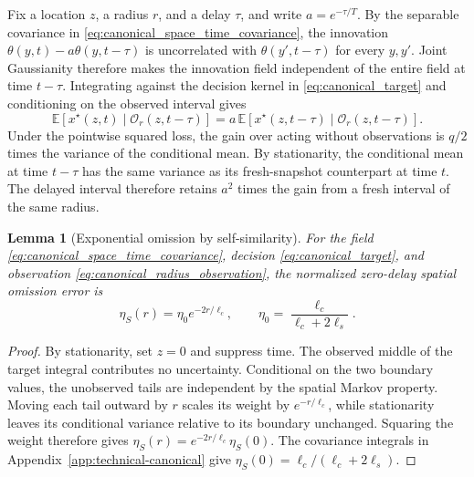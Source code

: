\documentclass[11pt]{article}
\newtheorem{lemma}{Lemma}
\begin{document}
Fix a location $z$, a radius $r$, and a delay $\tau$, and write
$a=e^{-\tau/T}$. By the separable covariance in
\eqref{eq:canonical_space_time_covariance}, the innovation
$\theta(y,t)-a\theta(y,t-\tau)$ is uncorrelated with
$\theta(y',t-\tau)$ for every $y,y'$. Joint Gaussianity therefore makes
the innovation field independent of the entire field at time $t-\tau$.
Integrating against the decision kernel in \eqref{eq:canonical_target}
and conditioning on the observed interval gives
\[
\mathbb E[x^\star(z,t)\mid \mathcal O_r(z,t-\tau)]
= a\,\mathbb E[x^\star(z,t-\tau)\mid \mathcal O_r(z,t-\tau)].
\]
Under the pointwise squared loss, the gain over acting without observations
is $q/2$ times the variance of the conditional mean. By stationarity,
the conditional mean at time $t-\tau$ has the same variance as its
fresh-snapshot counterpart at time $t$. The delayed interval therefore
retains $a^2$ times the gain from a fresh interval of the same radius.

\begin{lemma}[Exponential omission by self-similarity]
\label{prop:canonical_eta_S}
For the field \eqref{eq:canonical_space_time_covariance}, decision
\eqref{eq:canonical_target}, and observation
\eqref{eq:canonical_radius_observation}, the normalized zero-delay spatial
omission error is
\begin{equation}
\eta_S(r)=\eta_0e^{-2r/\ell_c},\qquad
\eta_0=\frac{\ell_c}{\ell_c+2\ell_s}.
\label{eq:canonical_eta_S}
\end{equation}
\end{lemma}

\begin{proof}
By stationarity, set $z=0$ and suppress time. The observed middle of the
target integral contributes no uncertainty. Conditional on the two boundary
values, the unobserved tails are independent by the spatial Markov property.
Moving each tail outward by $r$ scales its weight by $e^{-r/\ell_c}$,
while stationarity leaves its conditional variance relative to its boundary
unchanged. Squaring the weight therefore gives
$\eta_S(r)=e^{-2r/\ell_c}\eta_S(0)$.
The covariance integrals in Appendix~\ref{app:technical-canonical} give
$\eta_S(0)=\ell_c/(\ell_c+2\ell_s)$.
\end{proof}
\end{document}
